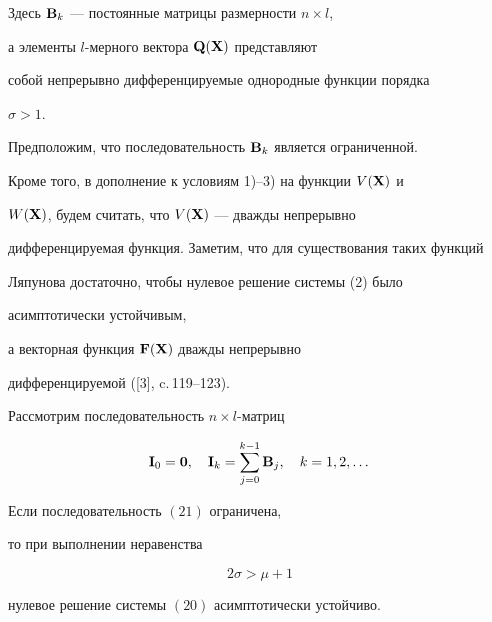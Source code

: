 Здесь $\bold B_k$ --- постоянные матрицы размерности $n\times l$,


а элементы $l$-мерного вектора $\bold Q(\bold X)$ представляют 


собой непрерывно дифференцируемые однородные функции порядка


$\sigma>1$.





Предположим, что последовательность $\bold B_k$ является ограниченной.


Кроме того, в дополнение к условиям 1)--3) на функции $V(\bold X)$ и


$W(\bold X)$, будем считать, что $V(\bold X)$ --- дважды непрерывно


дифференцируемая функция. Заметим, что для существования таких функций


Ляпунова достаточно, чтобы нулевое решение системы (2) было 


асимптотически устойчивым,


а векторная функция $\bold F(\bold X)$ дважды непрерывно


дифференцируемой ([3], c.\,119--123).





Рассмотрим последовательность $n\times l$-матриц


\begin{equation}


\bold I_0=\bold 0, \quad \bold I_k=\sum_{j=0}^{k-1} \bold B_j,


\quad k=1,2,\dotsc


\end{equation}





\begin{thm}


Если последовательность $(21)$ ограничена,


то при выполнении неравенства


\begin{equation}


2 \sigma>\mu+1


\end{equation}


нулевое решение системы $(20)$ асимптотически устойчиво.


\end{thm}





